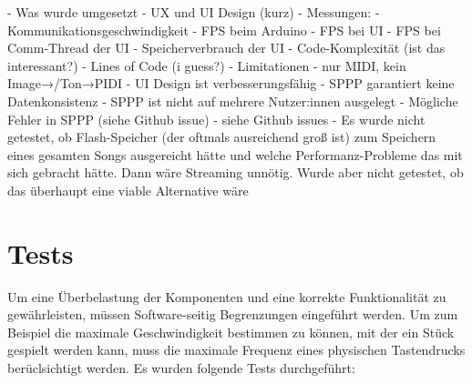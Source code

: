 - Was wurde umgesetzt \newline
- UX und UI Design (kurz) \newline
- Messungen: \newline
	- Kommunikationsgeschwindigkeit \newline
	- FPS beim Arduino \newline
	- FPS bei UI \newline
	- FPS bei Comm-Thread der UI \newline
	- Speicherverbrauch der UI \newline
	- Code-Komplexität (ist das interessant?) \newline
	- Lines of Code (i guess?) \newline
- Limitationen \newline
	- nur MIDI, kein Image→/Ton→PIDI \newline
	- UI Design ist verbesserungsfähig \newline
	- SPPP garantiert keine Datenkonsistenz \newline
	- SPPP ist nicht auf mehrere Nutzer:innen ausgelegt \newline
	- Mögliche Fehler in SPPP (siehe Github issue) \newline
	- siehe Github issues \newline
	- Es wurde nicht getestet, ob Flash-Speicher (der oftmals ausreichend groß ist) zum Speichern eines gesamten Songs ausgereicht hätte und welche Performanz-Probleme das mit sich gebracht hätte. Dann wäre Streaming unnötig. Wurde aber nicht getestet, ob das überhaupt eine viable Alternative wäre \newline



\section{Tests} \label{ergebnisse-tests}

Um eine Überbelastung der Komponenten und eine korrekte Funktionalität zu gewährleisten, müssen Software-seitig Begrenzungen eingeführt werden.
Um zum Beispiel die maximale Geschwindigkeit bestimmen zu können, mit der ein Stück gespielt werden kann, muss die maximale Frequenz eines physischen Tastendrucks berüclsichtigt werden.
Es wurden folgende Tests durchgeführt:

